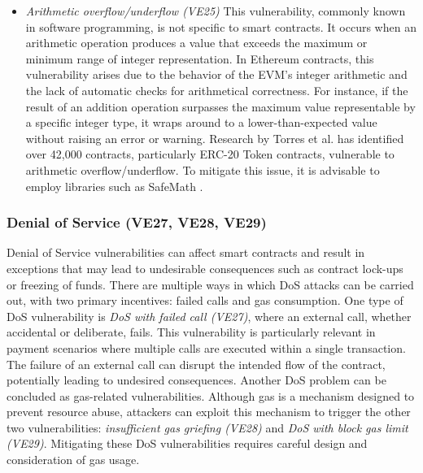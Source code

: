 \documentclass[manuscript,screen]{acmart}
\begin{document}
\begin{itemize}
 \item \textit{Arithmetic overflow/underflow (VE25)} This vulnerability, commonly known in software programming, is not specific to smart contracts. It occurs when an arithmetic operation produces a value that exceeds the maximum or minimum range of integer representation. In Ethereum contracts, this vulnerability arises due to the behavior of the EVM's integer arithmetic and the lack of automatic checks for arithmetical correctness. For instance, if the result of an addition operation surpasses the maximum value representable by a specific integer type, it wraps around to a lower-than-expected value without raising an error or warning. Research by Torres et al. \cite{TorresSS18} has identified over 42,000 contracts, particularly ERC-20 Token contracts, vulnerable to arithmetic overflow/underflow. To mitigate this issue, it is advisable to employ libraries such as SafeMath \cite{SafeMath}. 
 
\end{itemize}


\subsubsection{Denial of Service (VE27, VE28, VE29)} Denial of Service vulnerabilities can affect smart contracts and result in exceptions that may lead to undesirable consequences such as contract lock-ups or freezing of funds. There are multiple ways in which DoS attacks can be carried out, with two primary incentives: failed calls and gas consumption. One type of DoS vulnerability is \textit{DoS with failed call (VE27)}, where an external call, whether accidental or deliberate, fails. This vulnerability is particularly relevant in payment scenarios where multiple calls are executed within a single transaction. The failure of an external call can disrupt the intended flow of the contract, potentially leading to undesired consequences. Another DoS problem can be concluded as gas-related vulnerabilities. 
Although gas is a mechanism designed to prevent resource abuse, attackers can exploit this mechanism to trigger the other two vulnerabilities: \textit{insufficient gas griefing (VE28)} and \textit{DoS with block gas limit (VE29)}.
Mitigating these DoS vulnerabilities requires careful design and consideration of gas usage. 
 
\end{document}
